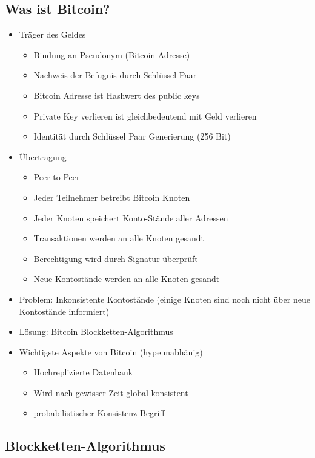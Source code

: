 \documentclass{article} %
\begin{document}
	\subsection{Was ist Bitcoin?}
	\begin{itemize}
		\item Träger des Geldes
		\begin{itemize}
			\item Bindung an Pseudonym (Bitcoin Adresse)
			\item Nachweis der Befugnis durch Schlüssel Paar
			\item Bitcoin Adresse ist Hashwert des public keys
			\item Private Key verlieren ist gleichbedeutend mit Geld verlieren
			\item Identität durch Schlüssel Paar Generierung (256 Bit)
		\end{itemize}
		\item Übertragung
		\begin{itemize}
			\item Peer-to-Peer
			\item Jeder Teilnehmer betreibt Bitcoin Knoten
			\item Jeder Knoten speichert Konto-Stände aller Adressen
			\item Transaktionen werden an alle Knoten gesandt
			\item Berechtigung wird durch Signatur überprüft
			\item Neue Kontostände werden an alle Knoten gesandt
		\end{itemize}
		\item Problem: Inkonsistente Kontostände (einige Knoten sind noch nicht über neue Kontostände informiert)
		\item Lösung: Bitcoin Blockketten-Algorithmus
		\item Wichtigste Aspekte von Bitcoin (hypeunabhänig)
			\begin{itemize}
				\item Hochreplizierte Datenbank
				\item Wird nach gewisser Zeit global konsistent
				\item probabilistischer Konsistenz-Begriff
			\end{itemize}
	\end{itemize}
	\subsection{Blockketten-Algorithmus}
\end{document}
